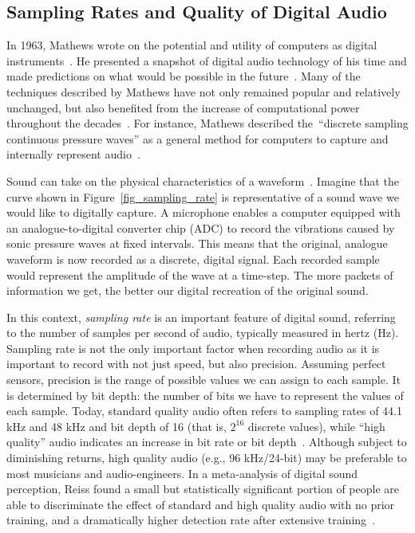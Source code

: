 \documentclass[\main/thesis.tex]{subfiles}
\begin{document}
\subsection{Sampling Rates and Quality of Digital Audio}
\label{sec_sampling_rates}
In 1963, Mathews wrote on the potential and utility of computers as digital instruments~\cite{mathews1963digital}. He presented a snapshot of digital audio technology of his time and made predictions on what would be possible in the future~\cite{mathews1963digital}. Many of the techniques described by Mathews have not only remained popular and relatively unchanged, but also benefited from the increase of computational power throughout the decades~\cite{mack2011fifty,smith1991viewpoints}. For instance, Mathews described the~\enquote{discrete sampling continuous pressure waves} as a general method for computers to capture and internally represent audio~\cite{mathews1963digital}.

Sound can take on the physical characteristics of a waveform~\cite{cook1999chap4}. Imagine that the curve shown in Figure~\ref{fig_sampling_rate} is representative of a sound wave we would like to digitally capture. A microphone enables a computer equipped with an analogue-to-digital converter chip (ADC) to record the vibrations caused by sonic pressure waves at fixed intervals. This means that the original, analogue waveform is now recorded as a discrete, digital signal. Each recorded sample would represent the amplitude of the wave at a time-step. The more packets of information we get, the better our digital recreation of the original sound.

In this context, \textit{sampling rate} is an important feature of digital sound, referring to the number of samples per second of audio, typically measured in hertz (Hz). Sampling rate is not the only important factor when recording audio as it is important to record with not just speed, but also precision. Assuming perfect sensors, precision is the range of possible values we can assign to each sample. It is determined by bit depth: the number of bits we have to represent the values of each sample.  Today, standard quality audio often refers to sampling rates of 44.1 kHz and 48 kHz and bit depth of 16 (that is, $2^{16}$ discrete values), while \enquote{high quality} audio indicates an increase in bit rate or bit depth~\cite{reiss2016meta}. Although subject to diminishing returns, high quality audio (e.g., 96 kHz/24-bit) may be preferable to most musicians and audio-engineers. In a meta-analysis of digital sound perception, Reiss found a small but statistically significant portion of people are able to discriminate the effect of standard and high quality audio with no prior training, and a dramatically higher detection rate after extensive training~\cite{reiss2016meta}. 
\end{document}
